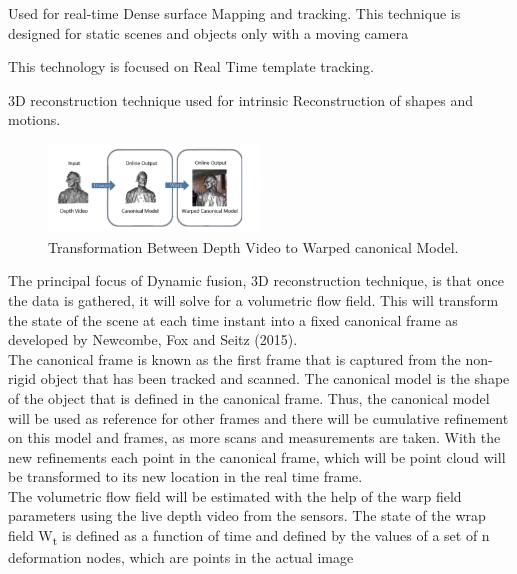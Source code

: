 \documentclass[a4paper]{article}
\begin{document}
\newpage
\begin{description}[style=nextline]
    \item[Kinect Fusion] Used for real-time Dense surface Mapping and tracking. This technique is designed for static scenes and objects only with a moving camera
    \item[DART (Dense Articulated Real Time Tracking)] This technology is focused on Real Time template tracking.
    \item[Animation Cartography] 3D reconstruction technique used for intrinsic Reconstruction of shapes and motions. 
\end{description}

\begin{figure} %
    \centering
    \includegraphics[width=0.5\textwidth]{IMG_0073.png}
    \caption{Transformation Between Depth Video to Warped canonical Model. \cite[]{newcombe_fox_seitz_2015}}
\end{figure}
The principal focus of Dynamic fusion, 3D reconstruction technique, is that once the data is gathered, it will solve for a volumetric flow field. 
This will transform the state of the scene at each time instant into a fixed canonical frame as developed by Newcombe, Fox and Seitz (2015). \\[10pt]
The canonical frame is known as the first frame that is captured from the non-rigid object that has been tracked and scanned. The canonical model is the shape of the object that is defined in the canonical frame. 
Thus, the canonical model will be used as reference for other frames and there will be cumulative refinement on this model and frames, as more scans and  measurements are taken.
With the new refinements each point in the canonical frame, which will be point cloud will be transformed to its new location in the real time frame.\\[10pt]
The volumetric flow field will be estimated with the help of the warp field parameters using the live depth video from the sensors. 
The state of the wrap field W\textsubscript{t} is defined as a function of time and defined by the values of a set of n deformation nodes, which are points in the actual image
\end{document}
